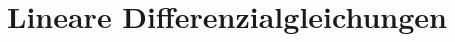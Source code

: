 \section{Lineare Differenzialgleichungen}
\begin{figure}[H] \centering
  
\end{figure}

\begin{figure}[H] \centering
  
\end{figure}